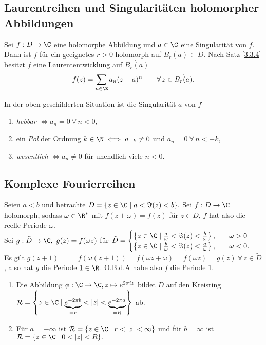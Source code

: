 \subsection*{Laurentreihen und Singularitäten holomorpher Abbildungen}\lecture
		
		Sei $ f: D \to \C $ eine holomorphe Abbildung und $a \in \C$ eine Singularität von $f$. Dann ist $f$ für ein geeignetes $ r > 0$ holomorph auf $ \dot{B_r(a)} \subset D $. Nach Satz \ref{3.3.4} besitzt $f$ eine Laurententwicklung auf $ \dot{B_r(a)} $
		\[ f(z) = \sum_{n \in \Z} a_n(z-a)^n\qquad \forall\, z \in \dot{B_r(a)}. \] 
		
		\begin{thm}\label{3.3.5}
			In der oben geschilderten Situation ist die Singularität $a$ von $f$
			\begin{enumerate}[label={\roman*})]
				\item \emph{hebbar} $\iff a_n = 0 \ \forall\, n<0$,
				\item ein \emph{Pol} der Ordnung $k \in \N \iff a_{-k} \neq 0 $ und $a_n=0 \ \forall\, n < -k$,
				\item \emph{wesentlich} $\iff a_n \neq 0$ für unendlich viele $n < 0$.
			\end{enumerate}
		\end{thm}
		
		\subsection*{Komplexe Fourierreihen}
		
		Seien $ a<b $ und betrachte $ D = \{z \in \C \mid a < \Im(z) < b\}. $ Sei $ f: D \to \C $ holomorph, sodass $ \omega \in \R^* $ mit $ f(z + \omega) = f(z) $ für $z \in D$, $f$ hat also die reelle Periode $\omega$.\\
		Sei $g: \tilde{D} \to \C,\ g(z) = f(\omega z)$ für $\tilde{D} = \begin{cases}
		\left\{ z \in \C \mid \frac{a}{\omega} < \Im(z) < \frac{b}{\omega} \right\}, \quad &\omega > 0\\
		\left\{ z \in \C \mid \frac{b}{\omega} < \Im(z) < \frac{a}{\omega} \right\}, \quad &\omega < 0.
		\end{cases}$\\
		Es gilt $ g(z+1) = = f(\omega(z+1)) = f(\omega z + \omega) = f(\omega z) = g(z)\ \forall \,z \in \tilde{D} $, also hat $g$ die Periode $1 \in \R$. O.B.d.A  habe also $f$ die Periode 1.
		
		\begin{lem}
			\begin{enumerate}[label={\roman*})]
				\item Die Abbildung $ \phi: \C\to \C, z \mapsto e^{2\pi iz} $ bildet $D$ auf den Kreisring $ \mathcal{R} = \left\{ z \in \C \mid \underbrace{e^{-2\pi b}}_{=r} < |z| < \underbrace{e^{-2\pi a}}_{=R} \right\} $ ab.
				\item Für $ a = - \infty $ ist $ \mathcal{R} = \{z \in \C \mid r < |z| < \infty\} $ und für $ b = \infty $ ist $ \mathcal{R} = \{ z\in \C \mid 0 < |z| < R\}. $
			\end{enumerate}
		\end{lem}
		
